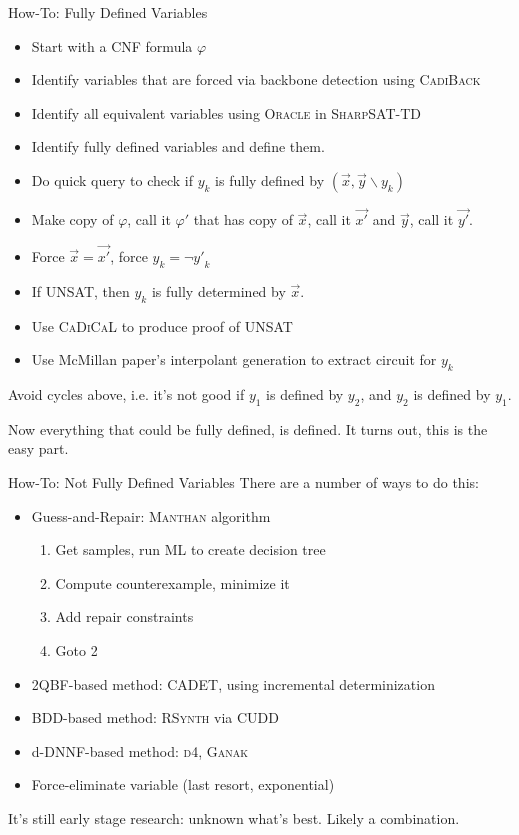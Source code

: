 \documentclass[aspectratio=169]{beamer}
\begin{document}
\begin{frame}{How-To: Fully Defined Variables}
\begin{itemize}
    \item Start with a CNF formula $ \varphi$
    \item Identify variables that are forced via backbone detection
        using \textsc{CadiBack}
    \item Identify all equivalent variables using \textsc{Oracle}
        in \textsc{SharpSAT-TD}
    \item Identify fully defined variables and define them.
\end{itemize}

\bigskip
\begin{itemize}
    \item Do quick query to check if $y_k$ is fully defined by $(\vec{x},
        \vec{y} \backslash y_k)$
    \item Make copy of $\varphi$, call it $\varphi'$ that has copy of
        $\vec{x}$, call it $\vec{x'}$ and $\vec{y}$, call it $\vec{y'}$.
    \item Force $\vec{x} = \vec{x'}$, force $y_k = \neg {y'}_k$
    \item If UNSAT, then $y_k$ is fully determined by $\vec{x}$.
    \item Use \textsc{CaDiCaL} to produce proof of UNSAT
    \item Use McMillan paper's interpolant generation to extract circuit for
        $y_k$
\end{itemize}
\bigskip
Avoid cycles above, i.e. it's not good if $y_1$ is defined by $y_2$, and $y_2$
is defined by $y_1$.
\bigskip

Now everything that could be fully defined, is defined. It turns out, this is
the easy part.
\end{frame}


\begin{frame}{How-To: Not Fully Defined Variables}
There are a number of ways to do this:
\begin{itemize}
    \item Guess-and-Repair: \textsc{Manthan} algorithm
        \begin{enumerate}
            \item Get samples, run ML to create decision tree
            \item Compute counterexample, minimize it
            \item Add repair constraints
            \item Goto 2
        \end{enumerate}
    \item 2QBF-based method: \textsc{CADET}, using incremental determinization
    \item BDD-based method: \textsc{RSynth} via \textsc{CUDD}
    \item d-DNNF-based method: \textsc{d4}, \textsc{Ganak}
    \item Force-eliminate variable (last resort, exponential)
\end{itemize}
\bigskip

It's still early stage research: unknown what's best. Likely a combination.
\end{frame}
\end{document}
